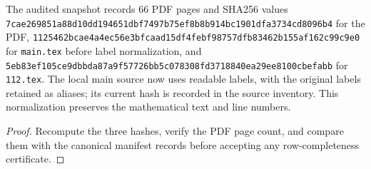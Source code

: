 \begin{proposition}
  \label{prop:paper-source-snapshot}

  \notready
  The audited snapshot records 66 PDF pages and SHA256 values
  \texttt{7cae269851a88d10dd194651dbf7497b75ef8b8b914bc1901dfa3734cd8096b4}
  for the PDF,
  \texttt{1125462bcae4a4ec56e3bfcaad15df4febf98757dfb83462b155af162c99c9e0}
  for \texttt{main.tex} before label normalization, and
  \texttt{5eb83ef105ce9dbbda87a9f57726bb5c078308fd3718840ea29ee8100cbefabb}
  for \texttt{112.tex}. The local main source now uses readable labels, with
  the original labels retained as aliases; its current hash is recorded in the
  source inventory. This normalization preserves the mathematical text and line numbers.
\end{proposition}

\begin{proof}
  Recompute the three hashes, verify the PDF page count, and compare them with
  the canonical manifest records before accepting any row-completeness
  certificate.
\end{proof}
